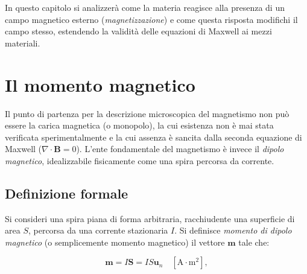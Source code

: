 \documentclass[a4paper,11pt]{report}
\begin{document}
In questo capitolo si analizzerà come la materia reagisce alla presenza di un campo magnetico esterno (\textit{magnetizzazione}) e come questa risposta modifichi il campo stesso, estendendo la validità delle equazioni di Maxwell ai mezzi materiali.

\section{Il momento magnetico}

Il punto di partenza per la descrizione microscopica del magnetismo non può essere la carica magnetica (o monopolo), la cui esistenza non è mai stata verificata sperimentalmente e la cui assenza è sancita dalla seconda equazione di Maxwell ($\nabla \cdot \bm{B} = 0$).
L'ente fondamentale del magnetismo è invece il \textit{dipolo magnetico}, idealizzabile fisicamente come una spira percorsa da corrente.

\subsection{Definizione formale}
Si consideri una spira piana di forma arbitraria, racchiudente una superficie di area $S$, percorsa da una corrente stazionaria $I$.
Si definisce \textit{momento di dipolo magnetico} (o semplicemente momento magnetico) il vettore $\bm{m}$ tale che:

\begin{equation}
    \bm{m} = I\bm{S} = I S \bm{u}_n \quad [\text{A} \cdot \text{m}^2],
    \label{eq:momento_magnetico}
\end{equation}
\end{document}
